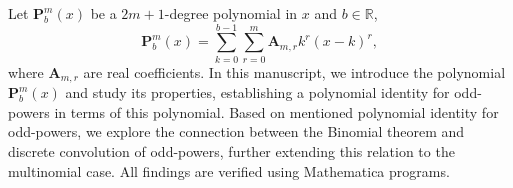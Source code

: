 Let $\mathbf{P}^{m}_{b}(x)$ be a $2m+1$-degree polynomial in $x$ and $b \in \mathbb{R}$,
\[
    \mathbf{P}^{m}_{b}(x) = \sum_{k=0}^{b-1} \sum_{r=0}^{m} \mathbf{A}_{m,r} k^r (x-k)^r,
\]
where $\mathbf{A}_{m,r}$ are real coefficients.
In this manuscript, we introduce the polynomial $\mathbf{P}^{m}_{b}(x)$ and study its properties,
establishing a polynomial identity for odd-powers in terms of this polynomial.
Based on mentioned polynomial identity for odd-powers,
we explore the connection between the Binomial theorem and discrete convolution of odd-powers,
further extending this relation to the multinomial case.
All findings are verified using Mathematica programs.
